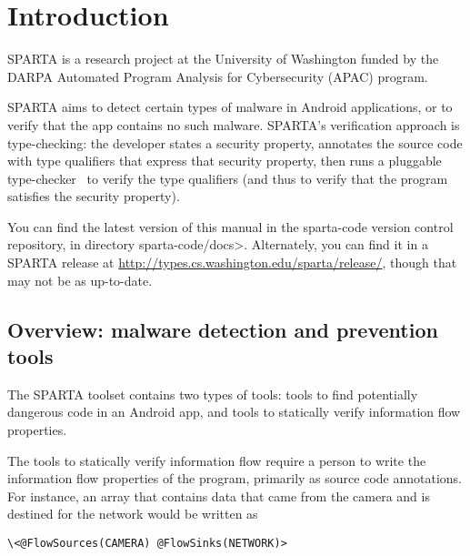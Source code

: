 \htmlhr
\chapter{Introduction\label{introduction}}

SPARTA is a research project at the University of Washington funded by the DARPA
 Automated Program Analysis for Cybersecurity (APAC) program.


SPARTA aims to detect certain types of malware in Android applications, or
to verify that the app contains no such malware.  SPARTA's verification
approach is type-checking:  the developer states a security property,
annotates the source code with type qualifiers that express that security
property, then runs a pluggable type-checker~\cite{PapiACPE2008,DietlDEMS2011} to verify the type
qualifiers (and thus to verify that the program satisfies the security
property).




You can find the latest version of this manual in the sparta-code version
control repository, in directory \<sparta-code/docs>.  Alternately, you can
find it in a SPARTA release at
\url{http://types.cs.washington.edu/sparta/release/}, though that may not
be as up-to-date.


\section{Overview:  malware detection and prevention tools}

The SPARTA toolset contains two types of tools:  tools to find potentially
dangerous code in an Android app, and tools to statically verify
information flow properties.

The tools to statically verify information flow require a person to write
the information flow properties of the program, primarily as source code
annotations.  For instance, an array that contains data that came from the
camera and is destined for the network would be written as 

\begin{Verbatim}
\<@FlowSources(CAMERA) @FlowSinks(NETWORK)>
\end{Verbatim}

